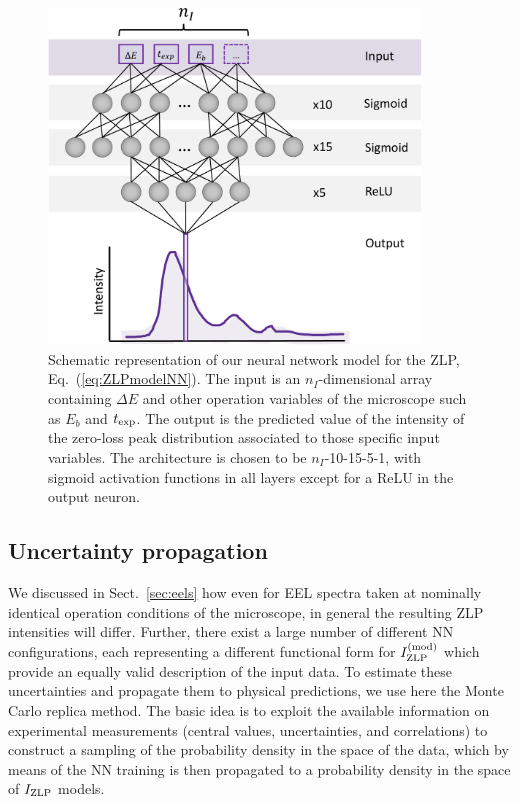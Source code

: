 \begin{figure}[t]
    \centering
    \includegraphics[width=99mm]{plots/architecture.pdf}
    \caption{Schematic representation of our neural network model for the ZLP, Eq.~(\ref{eq:ZLPmodelNN}).
      The input is an $n_I$-dimensional array containing $\Delta E$ and other
      operation variables of the microscope such as $E_b$ and $t_{\rm exp}$.
      The output is the predicted value of the intensity of the zero-loss peak
      distribution associated to those specific input variables.
      The architecture is chosen to be $n_I$-10-15-5-1, with sigmoid activation functions
      in all layers except for a ReLU in the output neuron.
    }
    \label{fig:architecture}
\end{figure}

\subsection{Uncertainty propagation}
\label{sec:MCreplicas}

We discussed in Sect.~\ref{sec:eels} how
even for EEL spectra taken at nominally identical operation conditions of the microscope,
in general the resulting ZLP intensities will differ.
%
Further, there exist a large number of different NN configurations, each
representing a different functional form for $I_{\rm ZLP}^{(\rm mod)}$ which provide
an equally valid description of the input data.
%
To  estimate these uncertainties and propagate them to physical predictions,
we use here the Monte Carlo replica method.
%
The basic idea  is to exploit the available information
on experimental measurements (central values, uncertainties, and correlations)
to construct a sampling of the probability density in the space of 
the data, which by means of the NN training is then propagated
to a probability density in the space of $I_{\rm ZLP}$ models.

